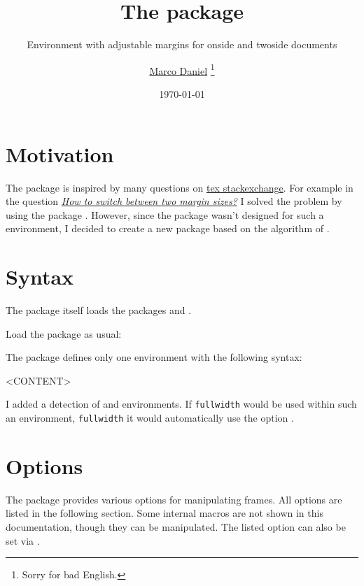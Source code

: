 \documentclass[parskip=false,english,11pt]{ltxmdf}
\title{The \fwdname package}
\subtitle{Environment with adjustable margins for onside and twoside documents}
\author{\href{mailto:marco.daniel@mada-nada.de}{Marco Daniel}%
       \footnote{Sorry for bad English.}}
\date{\today}
\def\fwdname{\texttt{fullwidth}\xspace}
\begin{document}
\maketitle

\section{Motivation}
The package is inspired by many questions on \href{http://tex.stackexchange.com/}{tex stackexchange}. For example in the question \href{http://tex.stackexchange.com/questions/34368/how-to-switch-between-two-margin-sizes}{\emph{How to switch between two margin sizes?}} I solved the problem by using the package \mdname. However, since the package wasn't designed for such a environment, I decided to create a new package based on the algorithm of \mdname.



\section{Syntax}\label{sec:syntax}
The package itself loads the packages  and .

Load the package as usual:
\begin{mdexample}
 \usepackage[<GLOBAL OPTIONS>]{fullwidth}
\end{mdexample}

The package defines only one environment with the following syntax:
\begin{mdexample}
 \begin{fullwidth}
    <CONTENT>
 \end{fullwidth}
\end{mdexample}


I added a detection of  and  environments. If \fwdname would be used within such an environment, \fwdname it would automatically use the option . 


\section{Options}
The package provides various options for manipulating frames. All options are listed in the following section. Some internal macros are not shown in this documentation, though they can be manipulated.
The listed option can also be set via .
\end{document}
